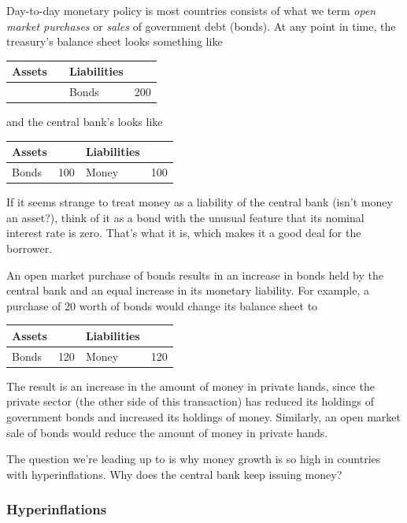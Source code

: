 \documentclass[letterpaper,12pt]{article}
\begin{document}
Day-to-day monetary policy is most countries consists of what we term
{\it open market purchases\/} or {\it sales\/} of government debt (bonds).
At any point in time, the treasury's balance sheet looks
something like
%
\begin{center}
\begin{tabular}{lr|lr}
Assets  &&  Liabilities \\
\hline
& & Bonds & 200
\end{tabular}
\end{center}
%
and the central bank's looks like
%
\begin{center}
\begin{tabular}{lr|lr}
Assets  &&  Liabilities \\
\hline
Bonds &  100 & Money & 100
\end{tabular}
\end{center}
%
If it seems strange to treat money as a liability of the
central bank (isn't money an asset?),
think of it as a bond with the unusual
feature that its nominal interest rate is zero.
That's what it is, which makes it a good deal for the borrower.


An open market purchase of bonds results in an increase
in bonds held by the central bank and an equal increase in its
monetary liability.
For example, a purchase of 20 worth of bonds would change its
balance sheet to
%
\begin{center}
\begin{tabular}{lr|lr}
Assets  &&  Liabilities \\
\hline
Bonds &  120 & Money & 120
\end{tabular}
\end{center}
%
The result is an increase in the amount of money in private hands,
since the private sector (the other side of this transaction)
has reduced its holdings of government bonds
and increased its holdings of money.
Similarly, an open market sale of bonds would reduce the amount of money in
private hands.

The question we're leading up to is why money growth is so high
in countries with hyperinflations.
Why does the central bank keep issuing money?


\subsubsection*{Hyperinflations}

\end{document}
